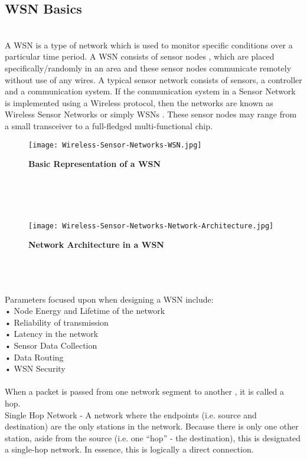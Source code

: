 \documentclass{article}
\begin{document}
\subsection{WSN Basics}\\
A WSN is a type of network which is used to monitor specific conditions over a particular time period. A WSN consists of sensor nodes , which are placed specifically/randomly in an area and these sensor nodes communicate remotely without use of any wires. A typical sensor network consists of sensors, a  controller and a communication system. If the communication system in a Sensor Network is implemented using a Wireless protocol, then the networks are known as Wireless Sensor Networks or simply WSNs . These sensor nodes may range from a small transceiver to a full-fledged multi-functional chip. 
\\
\begin{figure}[h] 
\begin{center} 
\texttt{[image: Wireless-Sensor-Networks-WSN.jpg]}  
\caption{{\bf{Basic Representation of a WSN} }} 
\label{Representation of a WSN} 
\end{center} 
\end{figure}\\
\\
\\
\begin{figure}[h] 
\begin{center} 
\texttt{[image: Wireless-Sensor-Networks-Network-Architecture.jpg]}  
\caption{{\bf{Network Architecture in a WSN} }} 
\label{Network Architecture} 
\end{center} 
\end{figure}\\
\\
\\
Parameters focused upon when designing a WSN include:\\
• Node Energy and Lifetime of the network\\
• Reliability of transmission\\
• Latency in the network\\
• Sensor Data Collection\\
• Data Routing\\
• WSN Security\\
\\
When a packet is passed from one network segment to another , it is called a hop.\\
Single Hop Network - A network where the endpoints (i.e. source and destination) are the only stations in the network. Because there is only one other station, aside from the source (i.e. one “hop” - the destination), this is designated a single-hop network. In essence, this is logically a direct connection.\\
\end{document}
